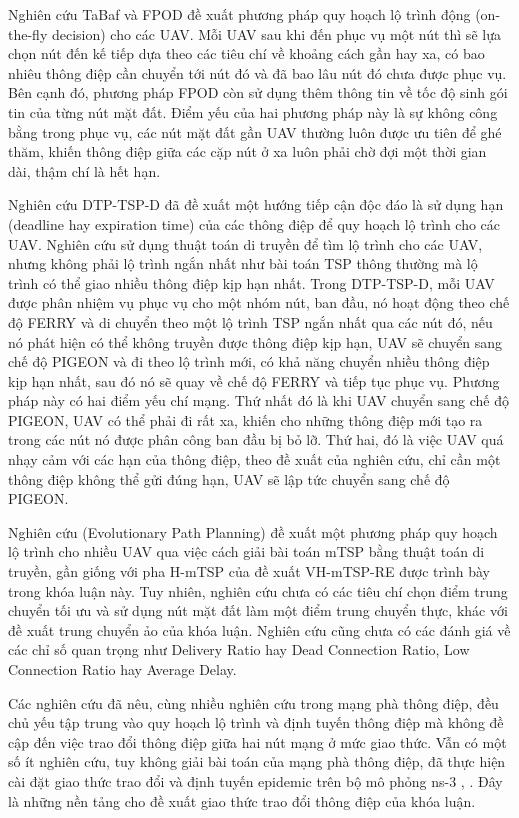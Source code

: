 \documentclass[a4paper]{article}
\begin{document}
Nghiên cứu TaBaf \cite{tabaf} và FPOD \cite{fpod} đề xuất phương pháp quy hoạch lộ trình động (on-the-fly decision) cho các UAV. Mỗi UAV sau khi đến phục vụ một nút thì sẽ lựa chọn nút đến kế tiếp dựa theo các tiêu chí về khoảng cách gần hay xa, có bao nhiêu thông điệp cần chuyển tới nút đó và đã bao lâu nút đó chưa được phục vụ. Bên cạnh đó, phương pháp FPOD còn sử dụng thêm thông tin về tốc độ sinh gói tin của từng nút mặt đất. Điểm yếu của hai phương pháp này là sự không công bằng trong phục vụ, các nút mặt đất gần UAV thường luôn được ưu tiên để ghé thăm, khiến thông điệp giữa các cặp nút ở xa luôn phải chờ đợi một thời gian dài, thậm chí là hết hạn.

Nghiên cứu DTP-TSP-D \cite{pigeon} đã đề xuất một hướng tiếp cận độc đáo là sử dụng hạn (deadline hay expiration time) của các thông điệp để quy hoạch lộ trình cho các UAV. Nghiên cứu sử dụng thuật toán di truyền để tìm lộ trình cho các UAV, nhưng không phải lộ trình ngắn nhất như bài toán TSP thông thường mà lộ trình có thể giao nhiều thông điệp kịp hạn nhất. Trong DTP-TSP-D, mỗi UAV được phân nhiệm vụ phục vụ cho một nhóm nút, ban đầu, nó hoạt động theo chế độ FERRY và di chuyển theo một lộ trình TSP ngắn nhất qua các nút đó, nếu nó phát hiện có thể không truyền được thông điệp kịp hạn, UAV sẽ chuyển sang chế độ PIGEON và đi theo lộ trình mới, có khả năng chuyển nhiều thông điệp kịp hạn nhất, sau đó nó sẽ quay về chế độ FERRY và tiếp tục phục vụ. Phương pháp này có hai điểm yếu chí mạng. Thứ nhất đó là khi UAV chuyển sang chế độ PIGEON, UAV có thể phải đi rất xa, khiến cho những thông điệp mới tạo ra trong các nút nó được phân công ban đầu bị bỏ lỡ. Thứ hai, đó là việc UAV quá nhạy cảm với các hạn của thông điệp, theo đề xuất của nghiên cứu, chỉ cần một thông điệp không thể gửi đúng hạn, UAV sẽ lập tức chuyển sang chế độ PIGEON. 

Nghiên cứu \cite{epp} (Evolutionary Path Planning) đề xuất một phương pháp quy hoạch lộ trình cho nhiều UAV qua việc cách giải bài toán mTSP bằng thuật toán di truyền, gần giống với pha H-mTSP của đề xuất VH-mTSP-RE được trình bày trong khóa luận này. Tuy nhiên, nghiên cứu chưa có các tiêu chí chọn điểm trung chuyển tối ưu và sử dụng nút mặt đất làm một điểm trung chuyển thực, khác với đề xuất trung chuyển ảo của khóa luận. Nghiên cứu cũng chưa có các đánh giá về các chỉ số quan trọng như Delivery Ratio hay Dead Connection Ratio, Low Connection Ratio hay Average Delay.

Các nghiên cứu đã nêu, cùng nhiều nghiên cứu trong mạng phà thông điệp, đều chủ yếu tập trung vào quy hoạch lộ trình và định tuyến thông điệp mà không đề cập đến việc trao đổi thông điệp giữa hai nút mạng ở mức giao thức. Vẫn có một số ít nghiên cứu, tuy không giải bài toán của mạng phà thông điệp, đã thực hiện cài đặt giao thức trao đổi và định tuyến epidemic trên bộ mô phỏng ns-3 \cite{ns3-epidemic-2015}, \cite{ns3-epidemic-2018}. Đây là những nền tảng cho đề xuất giao thức trao đổi thông điệp của khóa luận.
\end{document}
